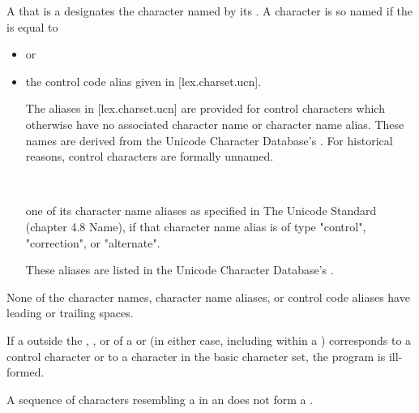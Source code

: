 \documentclass{wg21}
\begin{document}
\pnum
A 
that is a 
designates the character named by its .
A character is so named if the  is equal to
\begin{itemize}
    \item
    or
    \item
    \begin{removedblock}the control code alias given in [lex.charset.ucn].
    \begin{note}
        The aliases in [lex.charset.ucn] are provided for control characters
        which otherwise have no associated character name or character name alias.
        These names are derived from
        the Unicode Character Database's .
        For historical reasons, control characters are formally unnamed.
    \end{note}
    \end{removedblock}\\
    \begin{addedblock}
        one of its character name aliases as specified in The Unicode Standard (chapter 4.8 Name), if that character name alias is of type "control", "correction", or "alternate".\\\begin{note}These aliases are listed in the Unicode Character Database's .\end{note}
    \end{addedblock}
\end{itemize}
\begin{note}
    None of the  character names,
     character name aliases, or
    control code aliases
    have leading or trailing spaces.
\end{note}


\pnum
If a  outside
the , , or
 of
a  or 
(in either case, including within a )
corresponds to a control character or
to a character in the basic character set, the program is ill-formed.
\begin{note}
    A sequence of characters resembling a  in an
     does not form a
    .
\end{note}
\end{document}
